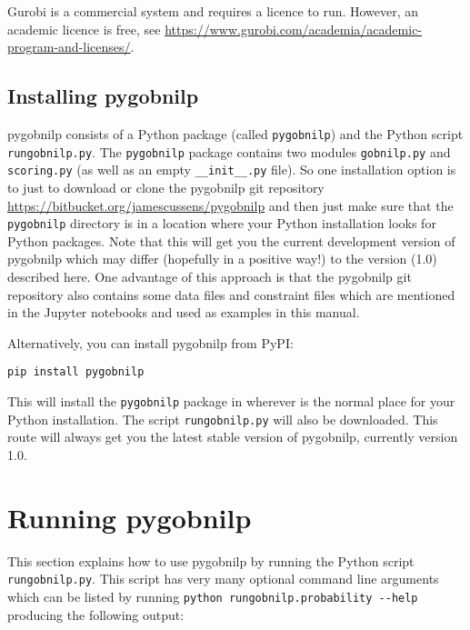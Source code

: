 \documentclass{article}
\newcommand{\pygobnilp}{\textsf{pygobnilp}}
\begin{document}
Gurobi is a commercial system and requires a licence to run. However,
an academic licence is free, see
\url{https://www.gurobi.com/academia/academic-program-and-licenses/}. 

\subsection{Installing \pygobnilp}
\label{sec:ip}

\pygobnilp{} consists of a Python package (called \texttt{pygobnilp})
and the Python script \texttt{rungobnilp.py}. The \texttt{pygobnilp}
package contains two modules \texttt{gobnilp.py} and
\texttt{scoring.py} (as well as an empty \texttt{\_\_init\_\_.py}
file). So one installation option is to just to download or clone the
\pygobnilp{} git repository
\url{https://bitbucket.org/jamescussens/pygobnilp} and then just make
sure that the \texttt{pygobnilp} directory is in a location where your
Python installation looks for Python packages. Note that this will get
you the current development version of \pygobnilp{} which may differ
(hopefully in a positive way!) to the version (1.0) described
here. One advantage of this approach is that the \pygobnilp{} git
repository also contains some data files and constraint files which
are mentioned in the Jupyter notebooks and used as examples in this manual.

Alternatively, you can install \pygobnilp{} from PyPI:
\begin{verbatim}
pip install pygobnilp
\end{verbatim}
This will install the \texttt{pygobnilp} package in wherever is the
normal place for your Python installation. The script
\texttt{rungobnilp.py} will also be downloaded. This route will always
get you the latest stable version of \pygobnilp{}, currently version 1.0.

\section{Running \pygobnilp}
\label{sec:running}

This section explains how to use \pygobnilp{} by running the Python
script \texttt{rungobnilp.py}. This script has very many optional
command line arguments which can be listed by running
\verb+python rungobnilp.probability --help+ producing the following
output:
\end{document}
